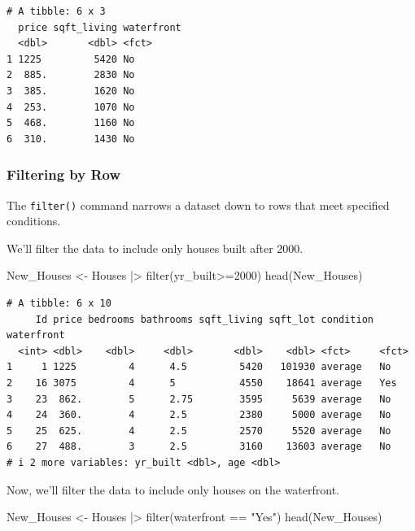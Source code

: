 \documentclass[
  letterpaper,
  DIV=11,
  numbers=noendperiod]{scrreprt}
\newenvironment{Shaded}{\begin{snugshade}}{\end{snugshade}}
\newcommand{\DecValTok}[1]{\textcolor[rgb]{0.68,0.00,0.00}{#1}}
\newcommand{\FunctionTok}[1]{\textcolor[rgb]{0.28,0.35,0.67}{#1}}
\newcommand{\NormalTok}[1]{\textcolor[rgb]{0.00,0.23,0.31}{#1}}
\newcommand{\OtherTok}[1]{\textcolor[rgb]{0.00,0.23,0.31}{#1}}
\newcommand{\SpecialCharTok}[1]{\textcolor[rgb]{0.37,0.37,0.37}{#1}}
\newcommand{\StringTok}[1]{\textcolor[rgb]{0.13,0.47,0.30}{#1}}
\begin{document}
\begin{verbatim}
# A tibble: 6 x 3
  price sqft_living waterfront
  <dbl>       <dbl> <fct>     
1 1225         5420 No        
2  885.        2830 No        
3  385.        1620 No        
4  253.        1070 No        
5  468.        1160 No        
6  310.        1430 No        
\end{verbatim}

\subsubsection*{Filtering by Row}\label{filtering-by-row}

The \texttt{filter()} command narrows a dataset down to rows that meet
specified conditions.

We'll filter the data to include only houses built after 2000.

\begin{Shaded}
\begin{Highlighting}[]
\NormalTok{New\_Houses }\OtherTok{\textless{}{-}}\NormalTok{ Houses }\SpecialCharTok{|\textgreater{}} \FunctionTok{filter}\NormalTok{(yr\_built}\SpecialCharTok{\textgreater{}=}\DecValTok{2000}\NormalTok{)}
\FunctionTok{head}\NormalTok{(New\_Houses)}
\end{Highlighting}
\end{Shaded}

\begin{verbatim}
# A tibble: 6 x 10
     Id price bedrooms bathrooms sqft_living sqft_lot condition waterfront
  <int> <dbl>    <dbl>     <dbl>       <dbl>    <dbl> <fct>     <fct>     
1     1 1225         4      4.5         5420   101930 average   No        
2    16 3075         4      5           4550    18641 average   Yes       
3    23  862.        5      2.75        3595     5639 average   No        
4    24  360.        4      2.5         2380     5000 average   No        
5    25  625.        4      2.5         2570     5520 average   No        
6    27  488.        3      2.5         3160    13603 average   No        
# i 2 more variables: yr_built <dbl>, age <dbl>
\end{verbatim}

Now, we'll filter the data to include only houses on the waterfront.

\begin{Shaded}
\begin{Highlighting}[]
\NormalTok{New\_Houses }\OtherTok{\textless{}{-}}\NormalTok{ Houses }\SpecialCharTok{|\textgreater{}} \FunctionTok{filter}\NormalTok{(waterfront }\SpecialCharTok{==} \StringTok{"Yes"}\NormalTok{)}
\FunctionTok{head}\NormalTok{(New\_Houses)}
\end{Highlighting}
\end{Shaded}
\end{document}

